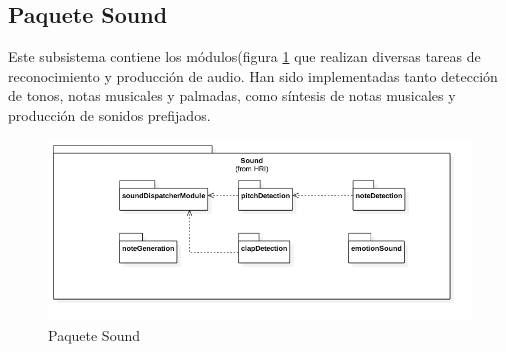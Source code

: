 \subsection{Paquete Sound}
Este subsistema contiene los módulos(figura \ref{fig:sound-package} que realizan diversas tareas de reconocimiento y producción de audio.  Han sido implementadas tanto detección de tonos, notas musicales y palmadas, como síntesis de notas musicales y producción de sonidos prefijados.
\begin{figure}
	\centering
	\includegraphics[width=1\linewidth]{imagenes/diagramas/Sound.png}
	\caption{Paquete Sound}
	\label{fig:sound-package}
\end{figure}
